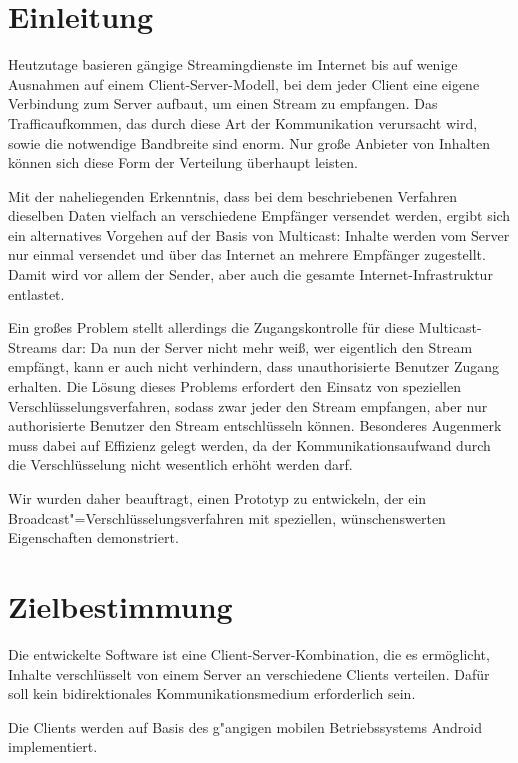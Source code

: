 \documentclass[a4paper,10pt]{scrartcl}
\title{\doctitle}
\author{\authorName}
\date{\today}
\begin{document}

\tableofcontents
\clearpage

\section{Einleitung}

Heutzutage basieren gängige Streamingdienste im Internet bis auf wenige Ausnahmen auf
einem Client-Server-Modell, bei dem jeder Client eine eigene Verbindung zum Server
aufbaut, um einen Stream zu empfangen. Das Trafficaufkommen, das durch diese Art der
Kommunikation verursacht wird, sowie die notwendige Bandbreite sind enorm. Nur große
Anbieter von Inhalten können sich diese Form der Verteilung überhaupt leisten.

Mit der naheliegenden Erkenntnis, dass bei dem beschriebenen Verfahren dieselben Daten
vielfach an verschiedene Empfänger versendet werden, ergibt sich ein alternatives
Vorgehen auf der Basis von Multicast: Inhalte werden vom Server nur einmal versendet
und über das Internet an mehrere Empfänger zugestellt. Damit wird vor allem der Sender,
aber auch die gesamte Internet-Infrastruktur entlastet.

Ein großes Problem stellt allerdings die Zugangskontrolle für diese Multicast-Streams
dar: Da nun der Server nicht mehr weiß, wer eigentlich den Stream empfängt, kann
er auch nicht verhindern, dass unauthorisierte Benutzer Zugang erhalten. Die Lösung
dieses Problems erfordert den Einsatz von speziellen Verschlüsselungsverfahren,
sodass zwar jeder den Stream empfangen, aber nur authorisierte Benutzer den Stream
entschlüsseln können. Besonderes Augenmerk muss dabei auf Effizienz gelegt werden,
da der Kommunikationsaufwand durch die Verschlüsselung nicht wesentlich erhöht werden
darf.

Wir wurden daher beauftragt, einen Prototyp zu entwickeln, der ein
Broadcast"=Verschlüsselungsverfahren mit speziellen, wünschenswerten Eigenschaften
demonstriert.

\section{Zielbestimmung}

Die entwickelte Software ist eine Client-Server-Kombination, die es ermöglicht,
Inhalte verschlüsselt von einem Server an verschiedene Clients verteilen. Dafür
soll kein bidirektionales Kommunikationsmedium erforderlich sein.

Die Clients werden auf Basis des g"angigen mobilen Betriebssystems Android
implementiert.
\end{document}
